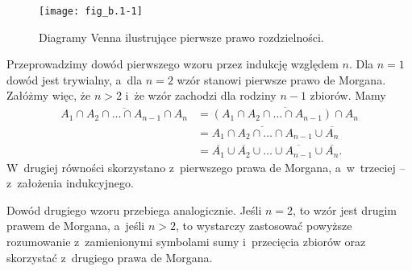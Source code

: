 
\exercise %
\begin{figure}[ht]
	\centering \texttt{[image: fig\_b.1-1]}
	\caption{Diagramy Venna ilustrujące pierwsze prawo rozdzielności.}
\end{figure}

\exercise %
Przeprowadzimy dowód pierwszego wzoru przez indukcję względem $n$.
Dla $n=1$ dowód jest trywialny, a~dla $n=2$ wzór stanowi pierwsze prawo de Morgana.
Załóżmy więc, że $n>2$ i~że wzór zachodzi dla rodziny $n-1$ zbiorów.
Mamy
\begin{align*}
	\overline{A_1\cap A_2\cap\dots\cap A_{n-1}\cap A_n} &= \overline{(A_1\cap A_2\cap\dots\cap A_{n-1})\cap A_n} \\
	&= \overline{A_1\cap A_2\cap\dots\cap A_{n-1}}\cup\overline{A_n} \\
	&= \overline{A_1}\cup\overline{A_2}\cup\dots\cup\overline{A_{n-1}}\cup\overline{A_n}.
\end{align*}
W~drugiej równości skorzystano z~pierwszego prawa de Morgana, a~w~trzeciej -- z~założenia indukcyjnego.

Dowód drugiego wzoru przebiega analogicznie.
Jeśli $n=2$, to wzór jest drugim prawem de Morgana, a~jeśli $n>2$, to wystarczy zastosować powyższe rozumowanie z~zamienionymi symbolami sumy i~przecięcia zbiorów oraz skorzystać z~drugiego prawa de Morgana.


